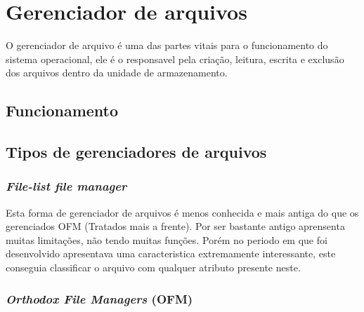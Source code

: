 \documentclass{article}
\begin{document}
\section{Gerenciador de arquivos}

O gerenciador de arquivo é uma das partes vitais para o funcionamento do sistema operacional, ele é o responsavel pela criação, leitura, escrita e exclusão dos arquivos dentro da unidade de armazenamento.

\subsection{Funcionamento}


\subsection{Tipos de gerenciadores de arquivos}


\subsubsection{\textit{File-list file manager}}

Esta forma de gerenciador de arquivos é menos conhecida e mais antiga do que os gerenciados OFM  (Tratados mais a frente). Por ser bastante antigo aprensenta muitas limitações, não tendo muitas funções. Porém no periodo em que foi desenvolvido apresentava uma caracteristica extremamente interessante, este conseguia classificar o arquivo com qualquer atributo presente neste.

\subsubsection{\textit{Orthodox File Managers} (OFM)}
\end{document}

